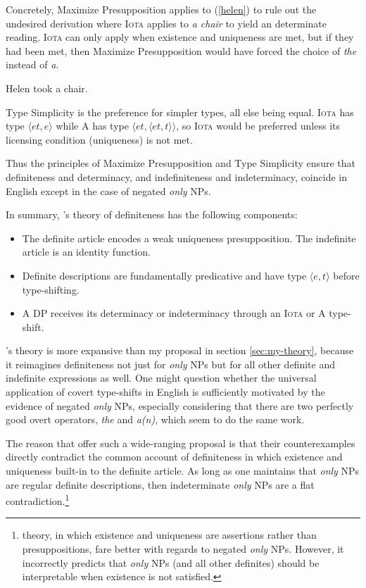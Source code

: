 Concretely, Maximize Presupposition applies to (\ref{helen}) to rule out the undesired derivation where \textsc{Iota} applies to \textit{a chair} to yield an determinate reading. \textsc{Iota} can only apply when existence and uniqueness are met, but if they had been met, then Maximize Presupposition would have forced the choice of \textit{the} instead of \textit{a}.

\begin{exe}
	\ex \label{helen} Helen took a chair.
\end{exe}

Type Simplicity is the preference for simpler types, all else being equal. \textsc{Iota} has type $\langle et, e \rangle$ while \textsc{A} has type $\langle et, \langle et, t \rangle \rangle$, so \textsc{Iota} would be preferred unless its licensing condition (uniqueness) is not met.

Thus the principles of Maximize Presupposition and Type Simplicity ensure that definiteness and determinacy, and indefiniteness and indeterminacy, coincide in English except in the case of negated \textit{only} NPs.

In summary, \citeauthor{cb2015}'s theory of definiteness has the following components:

\begin{itemize}
	\item The definite article encodes a weak uniqueness presupposition. The indefinite article is an identity function.
	\item Definite descriptions are fundamentally predicative and have type $\langle e, t \rangle$ before type-shifting.
	\item A DP receives its determinacy or indeterminacy through an \textsc{Iota} or \textsc{A} type-shift.
\end{itemize}

\citeauthor{cb2015}'s theory is more expansive than my proposal in section \ref{sec:my-theory}, because it reimagines definiteness not just for \textit{only} NPs but for all other definite and indefinite expressions as well. One might question whether the universal application of covert type-shifts in English is sufficiently motivated by the evidence of negated \textit{only} NPs, especially considering that there are two perfectly good overt operators, \textit{the} and \textit{a(n)}, which seem to do the same work.

The reason that \citeauthor{cb2015} offer such a wide-ranging proposal is that their counterexamples directly contradict the common account of definiteness in which existence and uniqueness built-in to the definite article. As long as one maintains that \textit{only} NPs are regular definite descriptions, then indeterminate \textit{only} NPs are a flat contradiction.\footnote{ theory, in which existence and uniqueness are assertions rather than presuppositions, fare better with regards to negated \textit{only} NPs. However, it incorrectly predicts that \textit{only} NPs (and all other definites) should be interpretable when existence is not satisfied.}

